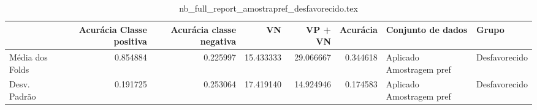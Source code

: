 \begin{table}
\centering
\caption{nb_full_report_amostrapref_desfavorecido.tex}
\label{nb_full_report_amostrapref_desfavorecido.tex}
\begin{tabular}{lrrrrrll}
\toprule
{}              &  Acurácia Classe positiva &  Acurácia classe negativa &        VN  &   VP + VN  &  Acurácia &         Conjunto de dados &          Grupo \\
\midrule
Média dos Folds &                  0.854884 &                  0.225997 &  15.433333 &  29.066667 &  0.344618 &  Aplicado Amostragem pref &  Desfavorecido \\
Desv. Padrão    &                  0.191725 &                  0.253064 &  17.419140 &  14.924946 &  0.174583 &  Aplicado Amostragem pref &  Desfavorecido \\
\bottomrule
\end{tabular}
\end{table}
